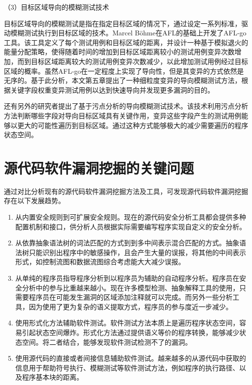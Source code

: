 （3）目标区域导向的模糊测试技术

目标区域导向的模糊测试是指在指定目标区域的情况下，通过设定一系列标准，驱动模糊测试执行到目标区域的技术。Marcel Böhme在AFL的基础上开发了AFL-go工具。该工具定义了每个测试用例和目标区域的距离，并设计一种基于模拟退火的能量分配策略，使得随着时间的增加到目标区域距离较小的测试用例变异次数增加，而到目标区域距离较大的测试用例变异次数减少，以此增加测试用例经过目标区域的概率。虽然AFL-go在一定程度上实现了导向性，但是其变异的方式依然是无序的。基于此分析，本文第五章提出了一种细粒度变异的导向模糊测试方法，根据关键字段权重变异测试用例以达到快速导向并发现更多漏洞的目的。

还有另外的研究者提出了基于污点分析的导向模糊测试技术。该技术利用污点分析方法判断哪些字段对导向目标区域具有关键作用，变异这些字段产生的测试用例能够以更大的可能性遍历到目标区域。通过这种方式能够极大的减少需要遍历的程序状态空间。


\section{源代码软件漏洞挖掘的关键问题}

通过对比分析现有的源代码软件漏洞挖掘方法及工具，可发现源代码软件漏洞挖掘存在以下发展趋势。%
\begin{enumerate}[(1)]
\item 从内置安全规则到可扩展安全规则。现在的源代码安全分析工具都会提供多种配置机制和接口，供分析人员根据实际需要编写程序实现自定义的安全分析。
\item 从依靠抽象语法树的词法匹配的方式到到多中间表示混合匹配的方式。抽象语法树只能识别出程序中的敏感操作，且会产生大量的误报，将其他的中间表示形式，如控制流图和数据流图综合考虑能大大减少误报。
\item 从单纯的程序员指导程序分析到以程序员为辅助的自动程序分析。程序员在安全分析中的参与比重越来越小。现在许多模型检测、抽象解释工具的使用，只需要程序员在可能发生漏洞的区域添加注释就可以完成。而另外一些分析工具，因为使用了更为复杂的语义提取方式，程序员的参与度近一步减少。
\item 使用形式化方法辅助软件测试。软件测试方法本质上是遍历程序状态空间，容易引起状态空间爆炸。形式化方法通过提供语义等价的程序转换，能够减少状态空间。将二者结合，能够发现软件测试检测不了的漏洞。
\item 使用源代码的直接或者间接信息辅助软件测试。越来越多的从源代码中获取的信息用于帮助符号执行、模糊测试等软件测试方法，例如程序的执行路径、以及程序基本块的距离。
\end{enumerate}

